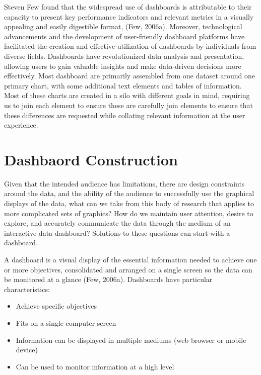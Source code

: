 \documentclass[print]{nuthesis}
\begin{document}
Steven Few found that the widespread use of dashboards is attributable to their capacity to present key performance indicators and relevant metrics in a visually appealing and easily digestible format, (Few, 2006a).
Moreover, technological advancements and the development of user-friendly dashboard platforms have facilitated the creation and effective utilization of dashboards by individuals from diverse fields.
Dashboards have revolutionized data analysis and presentation, allowing users to gain valuable insights and make data-driven decisions more effectively.
Most dashboard are primarily assembled from one dataset around one primary chart, with some additional text elements and tables of information.
Most of these charts are created in a silo with different goals in mind, requiring us to join each element to ensure these are carefully join elements to ensure that these differences are requested while collating relevant information at the user experience.

\hypertarget{dashbaord-construction}{%
\section{Dashbaord Construction}\label{dashbaord-construction}}

Given that the intended audience has limitations, there are design constraints around the data, and the ability of the audience to successfully use the graphical displays of the data, what can we take from this body of research that applies to more complicated sets of graphics?
How do we maintain user attention, desire to explore, and accurately communicate the data through the medium of an interactive data dashboard?
Solutions to these questions can start with a dashboard.

A dashboard is a visual display of the essential information needed to achieve one or more objectives, consolidated and arranged on a single screen so the data can be monitored at a glance (Few, 2006a).
Dashboards have particular characteristics:

\begin{itemize}
\item
  Achieve specific objectives
\item
  Fits on a single computer screen
\item
  Information can be displayed in multiple mediums (web browser or mobile device)
\item
  Can be used to monitor information at a high level
\end{itemize}
\end{document}
